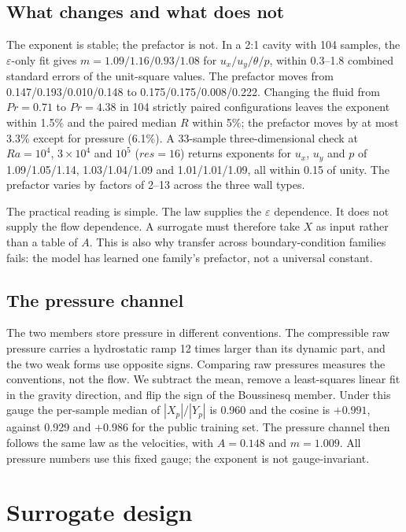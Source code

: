 \documentclass[preprint,11pt,a4paper,times]{elsarticle}
\begin{document}
\subsection{What changes and what does not}
\label{sec:aspect}

The exponent is stable; the prefactor is not. In a 2:1 cavity with 104 samples, the
$\varepsilon$-only fit gives $m=1.09/1.16/0.93/1.08$ for $u_x/u_y/\theta/p$, within
0.3--1.8 combined standard errors of the unit-square values. The prefactor moves from
0.147/0.193/0.010/0.148 to 0.175/0.175/0.008/0.222. Changing the fluid from $Pr=0.71$ to
$Pr=4.38$ in 104 strictly paired configurations leaves the exponent within 1.5\% and the
\label{sec:water}
paired median $R$ within 5\%; the prefactor moves by at most 3.3\% except for pressure
(6.1\%). A 33-sample three-dimensional check at $Ra=10^4$, $3\times10^4$ and $10^5$ ($res=16$)
\label{sec:3d}
returns exponents for $u_x$, $u_y$ and $p$ of 1.09/1.05/1.14, 1.03/1.04/1.09 and 1.01/1.01/1.09, all within
0.15 of unity. The prefactor varies by factors of 2--13 across the three wall types.

The practical reading is simple. The law supplies the $\varepsilon$ dependence. It does not
supply the flow dependence. A surrogate must therefore take $X$ as input rather than a table
of $A$. This is also why transfer across boundary-condition families fails: the model has
learned one family's prefactor, not a universal constant.

\subsection{The pressure channel}
\label{sec:pressure}

The two members store pressure in different conventions. The compressible raw pressure
carries a hydrostatic ramp 12 times larger than its dynamic part, and the two weak forms use
opposite signs. Comparing raw pressures measures the conventions, not the flow. We subtract
the mean, remove a least-squares linear fit in the gravity direction, and flip the sign of the
Boussinesq member. Under this gauge the per-sample median of $|X_p|/|Y_p|$ is 0.960 and the
cosine is $+0.991$, against 0.929 and $+0.986$ for the public training set. The pressure
channel then follows the same law as the velocities, with $A=0.148$ and $m=1.009$. All
pressure numbers use this fixed gauge; the exponent is not gauge-invariant.

\section{Surrogate design}
\label{sec:method}
\end{document}

